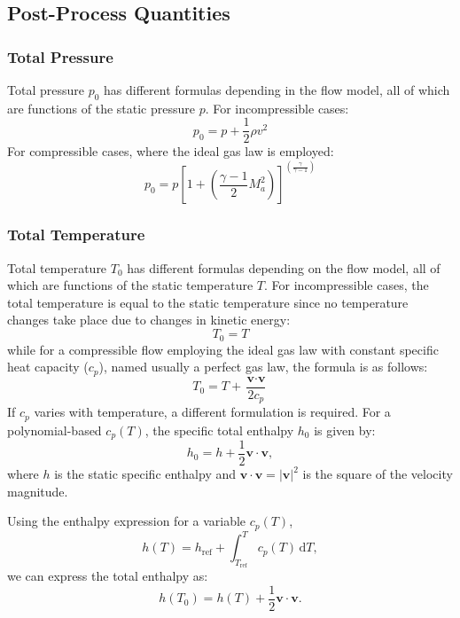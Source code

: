 \documentclass[12pt]{extarticle}
\newcommand{\<}{\langle}
\renewcommand{\>}{\rangle}
\theoremstyle{definition}
\begin{document}
\subsection{Post-Process Quantities}

\subsubsection{Total Pressure}
Total pressure $p_0$ has different formulas depending in the flow model, all of which are functions of the static pressure $p$. For incompressible cases:
\begin{equation}
    p_0 = p + \frac{1}{2} \rho v^2
\end{equation}
For compressible cases, where the ideal gas law is employed:
\begin{equation}
    p_0 = p \left[1+\left(\frac{\gamma-1}{2} M_a^2\right)\right]^{\left(\frac{\gamma}{\gamma-1}\right)}
\end{equation}

\subsubsection{Total Temperature}
Total temperature $T_0$ has different formulas depending on the flow model, all of which are functions of the static temperature $T$. For incompressible cases, the total temperature is equal to the static temperature since no temperature changes take place due to changes in kinetic energy:
\begin{equation}
    T_0 = T
\end{equation}
while for a compressible flow employing the ideal gas law with constant specific heat capacity ($c_p$), named usually a perfect gas law, the formula is as follows:
\begin{equation}
    T_0 = T + \frac{\textbf{v} \cdot \textbf{v}}{2 c_p}
\end{equation}
If \( c_p \) varies with temperature, a different formulation is required. For a polynomial-based \( c_p(T) \), the specific total enthalpy \( h_0 \) is given by:
\begin{equation}
    h_0 = h + \frac{1}{2} \mathbf{v} \cdot \mathbf{v},
\end{equation}
where \( h \) is the static specific enthalpy and \( \mathbf{v} \cdot \mathbf{v} = |\mathbf{v}|^2 \) is the square of the velocity magnitude.

Using the enthalpy expression for a variable \( c_p(T) \),
\begin{equation}
    h(T) = h_{\text{ref}} + \int_{T_{\text{ref}}}^{T} c_p(T) \, \mathrm{d}T,
\end{equation}
we can express the total enthalpy as:
\begin{equation}
    h(T_0) = h(T) + \frac{1}{2} \mathbf{v} \cdot \mathbf{v}.
\end{equation}
\end{document}
